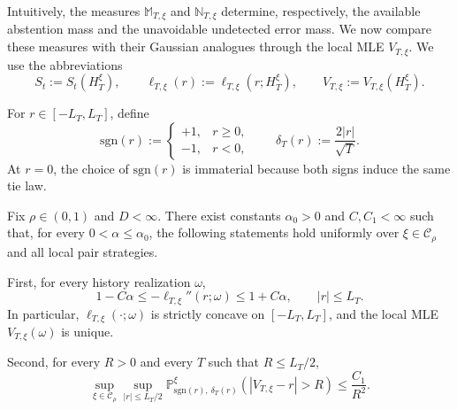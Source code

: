\documentclass[10pt]{article}
\theoremstyle{plain}
\begin{document}
Intuitively, the measures $\mathbb M_{T,\xi}$ and $\mathbb N_{T,\xi}$ determine,
respectively, the available abstention mass and the unavoidable undetected error mass. We now compare these measures with their Gaussian analogues through the
local MLE $V_{T,\xi}$. We use the abbreviations
\[
    S_t:=S_t(H_T^\xi),
    \qquad
    \ell_{T,\xi}(r)
    :=
    \ell_{T,\xi}(r;H_T^\xi),
    \qquad
    V_{T,\xi}
    :=
    V_{T,\xi}(H_T^\xi).
\]

For $r\in[-L_T,L_T]$, define
\[
    \mathrm{sgn}(r)
    :=
    \begin{cases}
        +1, & r\ge0,\\
        -1, & r<0,
    \end{cases}
    \qquad
    \delta_T(r)
    :=
    \frac{2|r|}{\sqrt T}.
\]
At $r=0$, the choice of $\mathrm{sgn}(r)$ is immaterial because both signs induce the
same tie law.

\begin{lemma}
\label{lem:curvature-tightness-transfer-lower}
Fix $\rho\in(0,1)$ and $D<\infty$. There exist constants
$\alpha_0>0$ and $C,C_1<\infty$ such that, for every
$0<\alpha\le\alpha_0$, the following statements hold uniformly over
$\xi\in\mathcal C_\rho$ and all local pair strategies.

First, for every history realization $\omega$,
\begin{equation}
\label{eq:curvature-bound-transfer-lower}
    1-C\alpha
    \le
    -\ell_{T,\xi}''(r;\omega)
    \le
    1+C\alpha,
    \qquad
    |r|\le L_T.
\end{equation}
In particular, $\ell_{T,\xi}(\cdot;\omega)$ is strictly concave on
$[-L_T,L_T]$, and the local MLE $V_{T,\xi}(\omega)$ is unique.

Second, for every $R>0$ and every $T$ such that $R\le L_T/2$,
\begin{equation}
\label{eq:local-mle-tightness-transfer-lower}
    \sup_{\xi\in\mathcal C_\rho}
    \sup_{|r|\le L_T/2}
    \mathbb P_{\mathrm{sgn}(r),\,\delta_T(r)}^\xi
    \left(
        |V_{T,\xi}-r|>R
    \right)
    \le
    \frac{C_1}{R^2}.
\end{equation}
\end{lemma}
\end{document}
